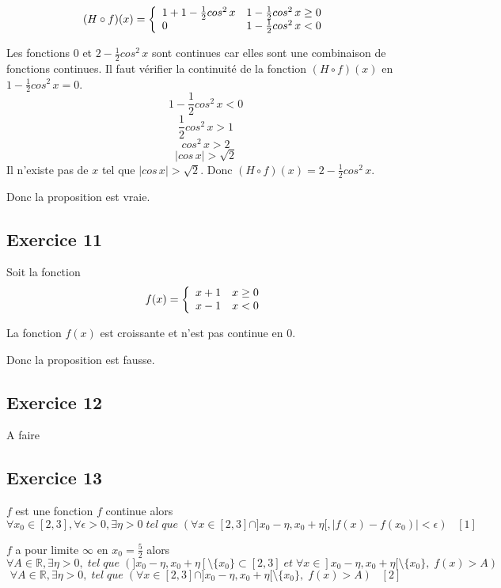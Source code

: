 \documentclass[]{book}
\theoremstyle{definition}
\newcommand{\bb}[1]{\mathbb{#1}}
\newcommand{\R}{\bb{R}}
\begin{document}
$$(H \circ f) (x) = 
\left\{ 
\begin{array}{l l}
 1 + 1 -\frac{1}{2}cos^2\, x & 1 -\frac{1}{2}cos^2\, x \ge 0\\
 0 & 1 -\frac{1}{2}cos^2\, x < 0\\
\end{array}
\right. 
$$

Les fonctions $0$ et $2 -\frac{1}{2}cos^2\, x$ sont continues car elles sont une combinaison de fonctions continues. Il faut v\'erifier la continuit\'e de la fonction $(H \circ f) (x)$ en $1 -\frac{1}{2}cos^2\, x = 0$.
$$1 -\frac{1}{2}cos^2\, x < 0$$
$$\frac{1}{2}cos^2\, x > 1$$
$$cos^2\, x > 2$$
$$|cos\, x| > \sqrt{2}$$
Il n'existe pas de $x$ tel que $|cos\, x| > \sqrt{2}$. Donc $(H \circ f) (x) = 2 -\frac{1}{2}cos^2\, x$.


Donc la proposition est vraie.

\subsection*{Exercice 11}
Soit la fonction 
$$f(x) = 
\left\{ 
\begin{array}{l l}
 x+1 & x \ge 0\\
 x-1 & x < 0\\
\end{array}
\right. 
$$

La fonction $f(x)$ est croissante et n'est pas continue en 0.


Donc la proposition est fausse.

\subsection*{Exercice 12}
A faire

\subsection*{Exercice 13}
$f$ est une fonction $f$ continue alors 
$$\forall x_0 \in [2,3], \forall \epsilon >0, \exists \eta > 0\; tel\; que\; (\forall x \in [2,3] \cap ]x_0-\eta, x_0+\eta[, |f(x)-f(x_0)| < \epsilon) \;\;\; [1]$$ 

$f$ a pour limite $\infty$ en $x_0=\frac{5}{2}$ alors
$$\forall A \in \R, \exists \eta > 0,\; tel\; que\; (]x_0-\eta, x_0+\eta[ \setminus \{x_0\} \subset [2,3] \; et \; \forall x \in ]x_0-\eta, x_0+\eta[ \setminus \{x_0\},\; f(x) > A)$$
$$\forall A \in \R, \exists \eta > 0,\; tel\; que\; (\forall x \in [2,3] \cap ]x_0-\eta, x_0+\eta[ \setminus \{x_0\}, \; f(x) > A) \;\;\; [2]$$
\end{document}
